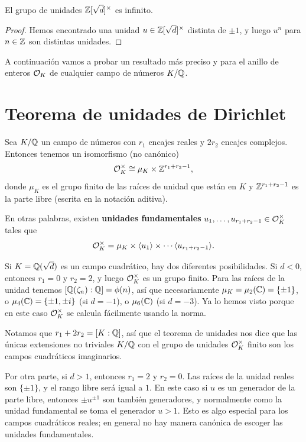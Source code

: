 \begin{corolario}
  El grupo de unidades $\mathbb{Z} [\sqrt{d}]^\times$ es infinito.

  \begin{proof}
    Hemos encontrado una unidad $u \in \mathbb{Z} [\sqrt{d}]^\times$ distinta de
    $\pm 1$, y luego $u^n$ para $n \in \mathbb{Z}$ son distintas unidades.
  \end{proof}
\end{corolario}

A continuación vamos a probar un resultado más preciso y para el anillo de
enteros $\mathcal{O}_K$ de cualquier campo de números $K/\mathbb{Q}$.


\section{Teorema de unidades de Dirichlet}

\begin{teorema}
  Sea $K/\mathbb{Q}$ un campo de números con $r_1$ encajes reales y $2 r_2$ encajes
  complejos. Entonces tenemos un isomorfismo (no canónico)
  $$\mathcal{O}_K^\times \cong \mu_K \times \mathbb{Z}^{r_1 + r_2 - 1},$$
  donde $\mu_K$ es el grupo finito de las raíces de unidad que están en $K$ y
  $\mathbb{Z}^{r_1 + r_2 - 1}$ es la parte libre (escrita en la notación aditiva).
\end{teorema}

En otras palabras, existen \textbf{unidades fundamentales}
$u_1,\ldots,u_{r_1+r_2-1} \in \mathcal{O}_K^\times$ tales que
$$\mathcal{O}_K^\times = \mu_K \times \langle u_1\rangle\times \cdots \langle u_{r_1+r_2-1}\rangle.$$

\begin{ejemplo}
  Si $K = \mathbb{Q} (\sqrt{d})$ es un campo cuadrático, hay dos diferentes
  posibilidades. Si $d < 0$, entonces $r_1 = 0$ y $r_2 = 2$, y luego
  $\mathcal{O}_K^\times$ es un grupo finito. Para las raíces de la unidad tenemos
  $[\mathbb{Q} (\zeta_n) : \mathbb{Q}] = \phi (n)$, así que necesariamente
  $\mu_K = \mu_2 (\mathbb{C}) = \{ \pm 1 \}$, o
  $\mu_4 (\mathbb{C}) = \{ \pm 1, \pm i \}$ (si $d = -1$), o $\mu_6 (\mathbb{C})$
  (si $d = -3$). Ya lo hemos visto porque en este caso $\mathcal{O}_K^\times$ se calcula
  fácilmente usando la norma.

  Notamos que $r_1 + 2 r_2 = [K : \mathbb{Q}]$, así que el teorema de unidades nos dice
  que las únicas extensiones no triviales $K/\mathbb{Q}$ con el grupo de unidades
  $\mathcal{O}_K^\times$ finito son los campos cuadráticos imaginarios.

  Por otra parte, si $d > 1$, entonces $r_1 = 2$ y $r_2 = 0$. Las raíces de la
  unidad reales son $\{ \pm 1 \}$, y el rango libre será igual a $1$. En este
  caso si $u$ es un generador de la parte libre, entonces $\pm u^{\pm 1}$ son
  también generadores, y normalmente como la unidad fundamental se toma el
  generador $u > 1$. Esto es algo especial para los campos cuadráticos reales;
  en general no hay manera canónica de escoger las unidades fundamentales.
\end{ejemplo}

